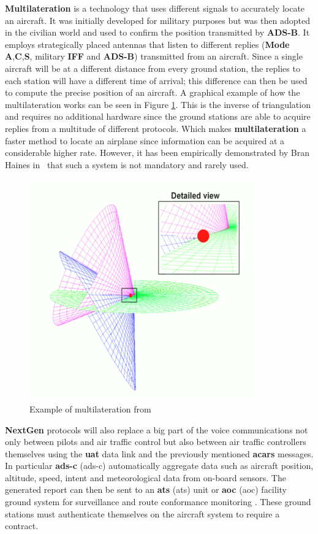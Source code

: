 \documentclass[../main.tex]{subfiles}
\begin{document}
\textbf{Multilateration} is a technology that uses different signals to accurately locate an aircraft. It was initially developed for military purposes but was then adopted in the civilian world and used to confirm the position transmitted by \textbf{ADS-B}. It employs strategically placed antennas that listen to different replies (\textbf{Mode A},\textbf{C},\textbf{S}, military \textbf{IFF} and \textbf{ADS-B}) transmitted from an aircraft. Since a single aircraft will be at a different distance from every ground station, the replies to each station will have a different time of arrival; this difference can then be used to compute the precise position of an aircraft. A graphical example of how the multilateration works can be seen in Figure \ref{fig:mlat}. This is the inverse of triangulation and requires no additional hardware since the ground stations are able to acquire replies from a multitude of different protocols. Which makes \textbf{multilateration} a faster method to locate an airplane since information can be acquired at a considerable higher rate. However, it has been empirically demonstrated by Bran Haines in~\cite{haineshackfest} that such a system is not mandatory and rarely used.

\begin{figure}[htp]
  \centering
  \includegraphics{images/mlat.png}
  \caption{Example of multilateration from \cite{Strohmeier2013}}
  \label{fig:mlat}
\end{figure}

\textbf{NextGen} protocols will also replace a big part of the voice communications not only between pilots and air traffic control but also between air traffic controllers themselves using the \textbf{\acrshort{uat}} data link and the previously mentioned \textbf{\acrshort{acars}} messages.
In particular \textbf{\acrshort{ads-c}} (\acrlong{ads-c}) automatically aggregate data such as aircraft position, altitude, speed, intent and meteorological data from on-board sensors. The generated report can then be sent to an \textbf{\acrshort{ats}} (\acrlong{ats}) unit or \textbf{\acrshort{aoc}} (\acrlong{aoc}) facility ground system for surveillance and route conformance monitoring \cite{goldman}. These ground stations must authenticate themselves on the aircraft system to require a contract.
\end{document}
